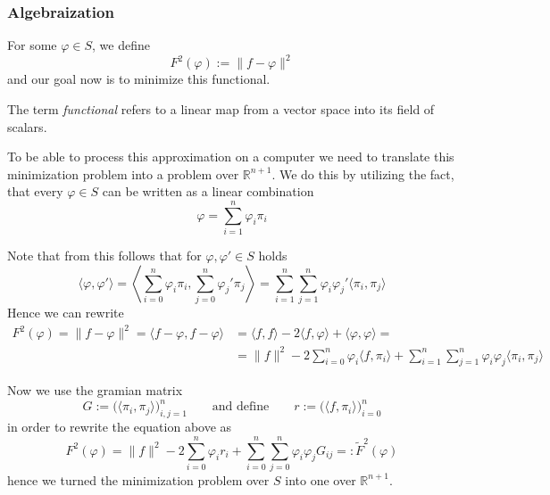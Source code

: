 \subsubsection{Algebraization}
For some \(\varphi \in S\), we define
\[F^2(\varphi) := \|f - \varphi\|^2\]
and our goal now is to minimize this functional.
\begin{remark}
   The term \emph{functional} refers to a linear map from a vector space into its field of scalars.
\end{remark}
To be able to process this approximation on a computer we need to translate this minimization problem into a problem over \(\mathbb{R}^{n+1}\).
We do this by utilizing the fact, that every \(\varphi \in S\) can be written as a linear combination
\[\varphi = \sum_{i=1}^n \varphi_i \pi_i\]

Note that from this follows that for \(\varphi, \varphi' \in S\) holds
\[\langle \varphi, \varphi' \rangle = \left\langle \sum_{i=0}^n \varphi_i \pi_i, \sum_{j=0}^n \varphi_j' \pi_j \right\rangle = \sum_{i=1}^n\sum_{j=1}^n \varphi_i \varphi_j' \langle \pi_i, \pi_j\rangle\]
Hence we can rewrite
\begin{equation*}
   \begin{split}
      F^2(\varphi) = \|f - \varphi\|^2 = \langle f - \varphi, f - \varphi\rangle & = \langle f, f\rangle - 2 \langle f, \varphi\rangle + \langle \varphi, \varphi\rangle = \\
                                                                                 & = \|f\|^2 - 2 \sum_{i=0}^n \varphi_i \langle f, \pi_i \rangle + \sum_{i=1}^n \sum_{j=1}^n \varphi_i \varphi_j \langle \pi_i, \pi_j \rangle
   \end{split}
\end{equation*}

Now we use the gramian matrix
\[G := \big(\langle \pi_i, \pi_j\rangle\big)_{i,j=1}^n \qquad\text{and define}\qquad r := \big(\langle f, \pi_i\rangle\big)_{i=0}^n\]
in order to rewrite the equation above as
\[F^2(\varphi) = \|f\|^2 - 2 \sum_{i=0}^n \varphi_ir_i + \sum_{i=0}^n\sum_{j=0}^n \varphi_i \varphi_j G_{ij} =: \widetilde{F}^2(\varphi)\]
hence we turned the minimization problem over \(S\) into one over \(\mathbb{R}^{n+1}\).

